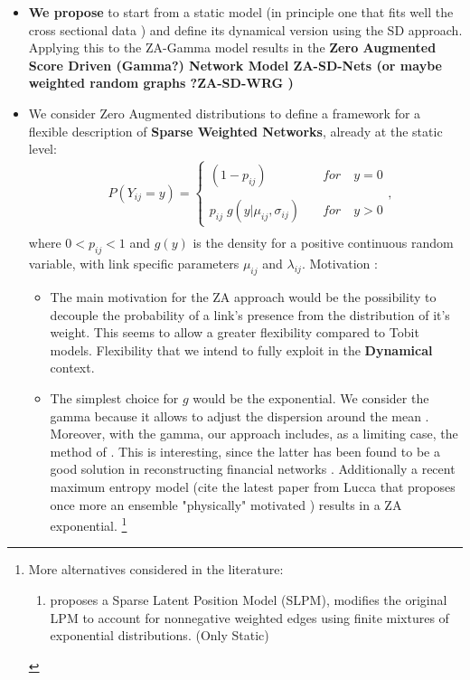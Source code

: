 \documentclass[a4paper,12pt]{article}
\newcommand{\tonde}[1]{\left(#1\right)}
\newcommand{\pt}[1]{\left(#1\right)}
\newcommand{\ba}{\begin{eqnarray}}
\newcommand{\ea}{\end{eqnarray}}
\newcommand{\Yij}{{Y_{ij}}}
\newcommand{\uij}{_{ij}}
\begin{document}
\begin{itemize}
	\item \textbf{We propose} to  start from a static model (in principle one that fits well the cross sectional data ) and define its dynamical version using the SD approach. Applying this to the ZA-Gamma model results in the \textbf{Zero Augmented Score Driven (Gamma?) Network Model ZA-SD-Nets (or maybe weighted random graphs ?ZA-SD-WRG )} 
	
	\item We consider  Zero Augmented distributions to define a framework for a flexible description of \textbf{Sparse Weighted Networks}, already at the static level:
	\ba\label{eq:ZeroAugWeightedNets}
	&P\tonde{\Yij  = y} =  \left\lbrace\begin{array}{ll} 	  \pt{1-p\uij} \quad &for \quad y=0 \\
		\nonumber\\
		p\uij  \; g \tonde{y\vert \mu\uij, \sigma\uij } \quad &for \quad y>0 \end{array}\right. ,\\
	\ea
	where $0<p\uij<1$ and $g\pt{y} $ is the density for a positive continuous random variable, with link specific parameters $\mu\uij$ and $\lambda\uij$.	
	Motivation :
	\begin{itemize}
		\item The main motivation for the ZA approach would be the possibility to decouple the probability of a link's presence from the distribution of it's weight. This seems to allow a greater flexibility compared to Tobit models. Flexibility that we intend to fully exploit in the \textbf{Dynamical} context.
		\item The simplest choice for $g$ would be the exponential. We consider the gamma because it allows to adjust the dispersion around the mean . Moreover, with the gamma, our approach includes, as a limiting case, the method of \cite{cimini2014reconstructing}. This is interesting, since the latter has been found to be a good solution in reconstructing financial networks \citep[see the wide comparative study of][]{ANAND2017}. Additionally a recent maximum entropy model (cite the latest paper from Lucca that proposes once more an ensemble "physically" motivated ) results in a ZA exponential.
		\footnote{ More alternatives considered in the literature: 
			\begin{enumerate}
				\item  \cite{rastelli2018sparse} proposes a Sparse Latent Position Model (SLPM), modifies the original LPM to account for nonnegative weighted edges using finite mixtures of exponential distributions. (Only Static)

\end{enumerate}}
\end{itemize}
\end{itemize}
\end{document}
